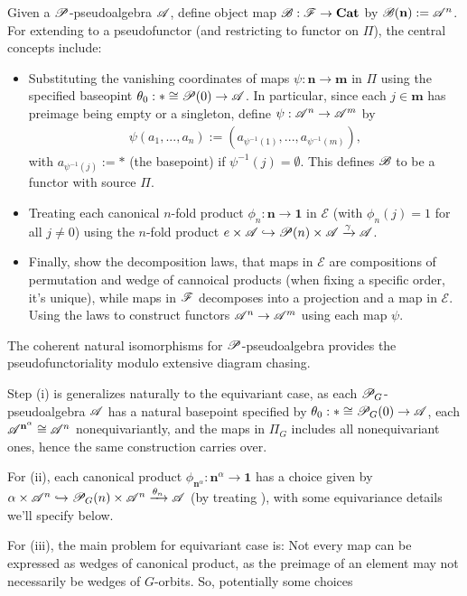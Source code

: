 \documentclass{article}
\begin{document}
Given a $\mathscr{P}$-pseudoalgebra $\mathscr{A}$, define object map $\mathscr{B}:\mathscr{F}\rightarrow\mathbf{Cat}$ by $\mathscr{B}(\mathbf{n}):=\mathscr{A}^n$. For extending to a pseudofunctor (and restricting to functor on $\Pi$), the central concepts include: 
\begin{itemize}
    \item[(i)] Substituting the vanishing coordinates of maps $\psi:\mathbf{n}\rightarrow\mathbf{m}$ in $\Pi$ using the specified baseopint $\theta_0:*\cong \mathscr{P}(0)\rightarrow\mathscr{A}$. In particular, since each $j\in\mathbf{m}$ has preimage being empty or a singleton, define $\psi:\mathscr{A}^n\rightarrow\mathscr{A}^m$ by 
    \begin{align}
        \psi(a_1,...,a_n):= (a_{\psi^{-1}(1)},...,a_{\psi^{-1}(m)}),
    \end{align}
    with $a_{\psi^{-1}(j)}:=*$ (the basepoint) if $\psi^{-1}(j)=\emptyset$. This defines $\mathscr{B}$ to be a functor with source $\Pi$.
    \item[(ii)] Treating each canonical $n$-fold product $\phi_n:\mathbf{n}\rightarrow\mathbf{1}$ in $\mathscr{E}$ (with $\phi_n(j)=1$ for all $j\neq 0$) using the $n$-fold product $e\times\mathscr{A}\hookrightarrow \mathscr{P}(n)\times \mathscr{A}\xrightarrow{\gamma}\mathscr{A}$.
    \item[(iii)] Finally, show the decomposition laws, that maps in $\mathscr{E}$ are compositions of permutation and wedge of cannoical products (when fixing a specific order, it's unique), while maps in $\mathscr{F}$ decomposes into a projection and a map in $\mathscr{E}$. Using the laws to construct functors $\mathscr{A}^n\rightarrow\mathscr{A}^m$ using each map $\psi$.
\end{itemize}

The coherent natural isomorphisms for $\mathscr{P}$-pseudoalgebra provides the pseudofunctoriality modulo extensive diagram chasing.

\hfil

Step (i) is generalizes naturally to the equivariant case, as each $\mathscr{P}_G$-pseudoalgebra $\mathscr{A}$ has a natural basepoint specified by $\theta_0:*\cong \mathscr{P}_G(0)\rightarrow\mathscr{A}$, each $\mathscr{A}^{\mathbf{n}^\alpha}\cong \mathscr{A}^n$ nonequivariantly, and the maps in $\Pi_G$ includes all nonequivariant ones, hence the same construction carries over. 

For (ii), each canonical product $\phi_{\mathbf{n}^\alpha}:\mathbf{n}^\alpha\rightarrow\mathbf{1}$ has a choice given by $\alpha\times \mathscr{A}^n\hookrightarrow \mathscr{P}_G(n)\times \mathscr{A}^n\xrightarrow{\theta_n}\mathscr{A}$ (by treating ), with some equivariance details we'll specify below.

For (iii), the main problem for equivariant case is: Not every map can be expressed as wedges of canonical product, as the preimage of an element may not necessarily be wedges of $G$-orbits. So, potentially some choices
\end{document}
